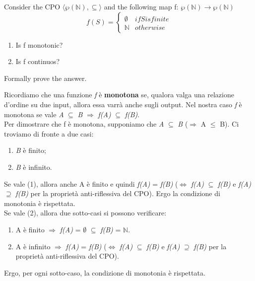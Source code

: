 {
    Consider the CPO $\langle\wp(\mathbb{N}),\subseteq\rangle$ and the following map f: $\wp(\mathbb{N})\rightarrow\wp(\mathbb{N})$
    \begin{equation}
    f(S) =
    \begin{cases*}
    \emptyset & if S is finite \\
    \mathbb N        & otherwise
    \end{cases*}
    \end{equation}
    \begin{enumerate}
        \item Is f monotonic?
        \item Is f continuos?
    \end{enumerate}
    Formally prove the answer.
}
{
	Ricordiamo che una funzione \textit{f} è \textbf{monotona} se, qualora valga una relazione d'ordine su due input, allora essa varrà anche sugli output. Nel nostra caso \textit{f} è monotona se vale \textit{A} $\subseteq$ \textit{B} $\Rightarrow$ \textit{f(A)} $\subseteq$ \textit{f(B)}.\\
	Per dimostrare che f è monotona, supponiamo che \textit{A} $\subseteq$ \textit{B} ($\Rightarrow$ \textbar A\textbar{} $\leq$ \textbar B\textbar{}). Ci troviamo di fronte a due casi:
	\begin{enumerate}
		\item \textit{B} è finito;
		\item \textit{B} è infinito.
	\end{enumerate}
	Se vale (1), allora anche \textbar A\textbar{} è finito e quindi \textit{f(A)} = \textit{f(B)} ($\iff$ \textit{f(A)} $\subseteq$ \textit{f(B)} e \textit{f(A)} $\supseteq$ \textit{f(B)} per la proprietà anti-riflessiva del CPO). Ergo la condizione di monotonia è rispettata.\\
	
	Se vale (2), allora due sotto-casi si possono verificare:
	\begin{enumerate}
		\item A è finito $\Rightarrow$ \textit{f(A)} = $\emptyset$ $\subseteq$ \textit{ f(B)} = $\mathbb{N}$.
		\item A è infinito $\Rightarrow$ \textit{f(A)} = \textit{f(B)} ($\iff$ \textit{f(A)} $\subseteq$ \textit{f(B)} e \textit{f(A)} $\supseteq$ \textit{f(B)} per la proprietà anti-riflessiva del CPO).
	\end{enumerate}
	
	Ergo, per ogni sotto-caso, la condizione di monotonia è rispettata.\\
	
}
